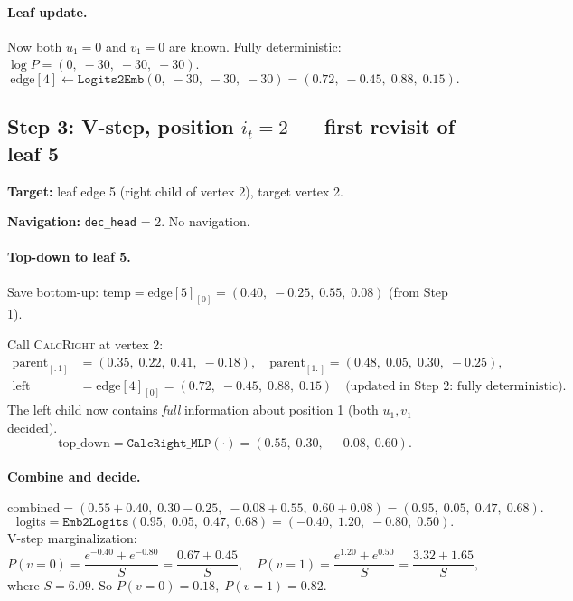 \documentclass[11pt,a4paper]{article}
\newcommand{\calR}{\textsc{CalcRight}}
\begin{document}
\paragraph{Leaf update.}
Now both $u_1 = 0$ and $v_1 = 0$ are known.  Fully deterministic: $\log P = (0,\; -30,\; -30,\; -30)$.
\[
\text{edge}[4] \leftarrow \texttt{Logits2Emb}(0,\; -30,\; -30,\; -30) = (0.72,\; -0.45,\; 0.88,\; 0.15).
\]

\subsection{Step 3: V-step, position $i_t = 2$ --- first revisit of leaf 5}

\textbf{Target:} leaf edge 5 (right child of vertex 2), target vertex 2.

\textbf{Navigation:} \texttt{dec\_head} = 2.  No navigation.

\paragraph{Top-down to leaf 5.}
Save bottom-up: $\text{temp} = \text{edge}[5]_{[0]} = (0.40,\; -0.25,\; 0.55,\; 0.08)$ (from Step 1).

Call \calR{} at vertex 2:
\begin{align*}
\text{parent}_{[:1]} &= (0.35,\; 0.22,\; 0.41,\; -0.18), \quad
\text{parent}_{[1:]} = (0.48,\; 0.05,\; 0.30,\; -0.25), \\
\text{left} &= \text{edge}[4]_{[0]} = (0.72,\; -0.45,\; 0.88,\; 0.15) \quad \text{(updated in Step 2: fully deterministic)}.
\end{align*}
The left child now contains \emph{full} information about position 1 (both $u_1, v_1$ decided).
\[
\text{top\_down} = \texttt{CalcRight\_MLP}(\cdot) = (0.55,\; 0.30,\; -0.08,\; 0.60).
\]

\paragraph{Combine and decide.}
\[
\text{combined} = (0.55 + 0.40,\; 0.30 - 0.25,\; -0.08 + 0.55,\; 0.60 + 0.08) = (0.95,\; 0.05,\; 0.47,\; 0.68).
\]
\[
\text{logits} = \texttt{Emb2Logits}(0.95,\; 0.05,\; 0.47,\; 0.68) = (-0.40,\; 1.20,\; -0.80,\; 0.50).
\]
V-step marginalization:
\[
P(v{=}0) = \frac{e^{-0.40} + e^{-0.80}}{S} = \frac{0.67 + 0.45}{S}, \quad
P(v{=}1) = \frac{e^{1.20} + e^{0.50}}{S} = \frac{3.32 + 1.65}{S},
\]
where $S = 6.09$.  So $P(v{=}0) = 0.18,\; P(v{=}1) = 0.82$.
\end{document}
